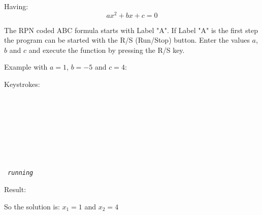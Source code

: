 \documentclass[a4paper, landscape]{article}
\begin{document}
Having:
$$ a x^2 + b x + c = 0 $$ 

\bigskip

The RPN coded ABC formula starts with Label "A". If Label "A" is the first step the program can be started with the R/S (Run/Stop) button. Enter the values $a$, $b$ and $c$ and execute the function by pressing the R/S key.

\bigskip
Example with  $a = 1$, $ b = -5$ and $c = 4$:

\bigskip
Keystrokes: \\
\tt
\indent {} \\
\indent \ENTERelc \\
\indent {} \\
\indent \CHSelc \\
\indent \ENTERelc \\
\indent {} \\
\indent \RSelc \\
\\
\indent \it { running }
\rm

\bigskip
Result:
\XswapYelc
{}

\bigskip
So the solution is: $x_1 = 1$ and $x_2 = 4$

\bigskip
\end{document}
